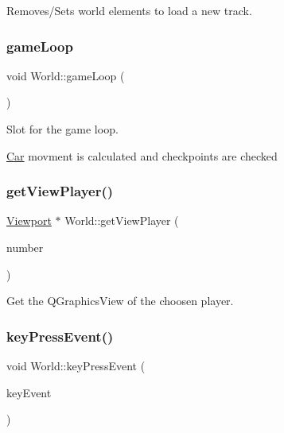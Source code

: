 Removes/\+Sets world elements to load a new track. 

\mbox{\label{class_world_af2b4ba4ce188c2770f13108e4277414f}} 
\subsubsection{\texorpdfstring{gameLoop}{gameLoop}}
{\footnotesize\ttfamily void World\+::game\+Loop (\begin{DoxyParamCaption}{ }\end{DoxyParamCaption})\hspace{0.3cm}{\ttfamily [slot]}}



Slot for the game loop. 

\mbox{\hyperlink{class_car}{Car}} movment is calculated and checkpoints are checked \mbox{\label{class_world_aa3c1a0e1064a02a465f9e4c3574fd6bd}} 
\subsubsection{\texorpdfstring{getViewPlayer()}{getViewPlayer()}}
{\footnotesize\ttfamily \mbox{\hyperlink{class_viewport}{Viewport}} $\ast$ World\+::get\+View\+Player (\begin{DoxyParamCaption}\item[{int}]{number }\end{DoxyParamCaption})}



Get the Q\+Graphics\+View of the choosen player. 

\mbox{\label{class_world_a953a781e77b87cd47433e0a24c4b1cbd}} 
\subsubsection{\texorpdfstring{keyPressEvent()}{keyPressEvent()}}
{\footnotesize\ttfamily void World\+::key\+Press\+Event (\begin{DoxyParamCaption}\item[{Q\+Key\+Event $\ast$}]{key\+Event }\end{DoxyParamCaption})}



